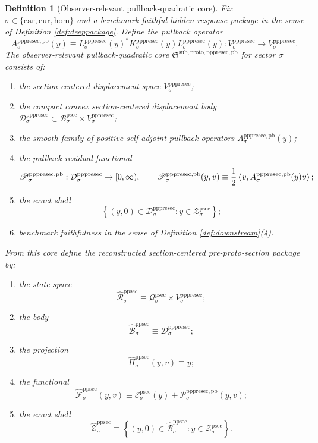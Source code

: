 \documentclass[11pt]{article}
\newcommand{\Car}{\mathrm{car}}
\newcommand{\Cur}{\mathrm{cur}}
\newcommand{\Hom}{\mathrm{hom}}
\newcommand{\ProtoSectionState}[1]{\mathcal Q_{#1}^{\mathrm{psec}}}
\newcommand{\ProtoSectionBody}[1]{\mathcal B_{#1}^{\mathrm{psec}}}
\newcommand{\ProtoSectionFunctional}[1]{\mathscr E_{#1}^{\mathrm{psec}}}
\newcommand{\ProtoSectionShell}[1]{\mathcal Z_{#1}^{\mathrm{psec}}}
\newcommand{\PrePreProtoSectionVertical}[1]{V_{#1}^{\mathrm{pppresec}}}
\newcommand{\PrePreProtoSectionResidualBody}[1]{\mathcal D_{#1}^{\mathrm{pppresec}}}
\newcommand{\PrePreProtoSectionResponseMap}[1]{L_{#1}^{\mathrm{pppresec}}}
\newcommand{\PrePreProtoSectionOperator}[1]{K_{#1}^{\mathrm{pppresec}}}
\newcommand{\PrePreProtoSectionPullbackCore}{\mathfrak S^{\mathrm{sub,proto,pppresec,pb}}}
\newcommand{\PrePreProtoSectionPullbackOperator}[1]{A_{#1}^{\mathrm{pppresec,pb}}}
\newcommand{\PrePreProtoSectionPullbackFunctional}[1]{\mathscr P_{#1}^{\mathrm{pppresec,pb}}}
\newcommand{\PullbackPreProtoSectionState}[1]{\widehat{\mathcal R}_{#1}^{\mathrm{ppsec}}}
\newcommand{\PullbackPreProtoSectionBody}[1]{\widehat{\mathcal B}_{#1}^{\mathrm{ppsec}}}
\newcommand{\PullbackPreProtoSectionProj}[1]{\widehat{\Pi}_{#1}^{\mathrm{ppsec}}}
\newcommand{\PullbackPreProtoSectionFunctional}[1]{\widehat{\mathscr F}_{#1}^{\mathrm{ppsec}}}
\newcommand{\PullbackPreProtoSectionShell}[1]{\widehat{\mathcal Z}_{#1}^{\mathrm{ppsec}}}
\newtheorem{definition}{Definition}
\begin{document}
\begin{definition}[Observer-relevant pullback-quadratic core]
\label{def:pullback}
Fix \(\sigma\in\{\Car,\Cur,\Hom\}\) and a benchmark-faithful hidden-response package in the sense of Definition \ref{def:deeppackage}. Define the pullback operator
\[
\PrePreProtoSectionPullbackOperator{\sigma}(y)
\equiv
\PrePreProtoSectionResponseMap{\sigma}(y)^{*}
\PrePreProtoSectionOperator{\sigma}(y)
\PrePreProtoSectionResponseMap{\sigma}(y)
:
\PrePreProtoSectionVertical{\sigma}\to\PrePreProtoSectionVertical{\sigma}.
\]
The \emph{observer-relevant pullback-quadratic core} \(\PrePreProtoSectionPullbackCore\) for sector \(\sigma\) consists of:
\begin{enumerate}
    \item the section-centered displacement space \(\PrePreProtoSectionVertical{\sigma}\);
    \item the compact convex section-centered displacement body \(\PrePreProtoSectionResidualBody{\sigma}\subset\ProtoSectionBody{\sigma}\times\PrePreProtoSectionVertical{\sigma}\);
    \item the smooth family of positive self-adjoint pullback operators \(\PrePreProtoSectionPullbackOperator{\sigma}(y)\);
    \item the pullback residual functional
    \[
    \PrePreProtoSectionPullbackFunctional{\sigma}:
    \PrePreProtoSectionResidualBody{\sigma}\to[0,\infty),
    \qquad
    \PrePreProtoSectionPullbackFunctional{\sigma}(y,v)
    \equiv
    \frac{1}{2}
    \ev{v,\PrePreProtoSectionPullbackOperator{\sigma}(y)v};
    \]
    \item the exact shell
    \[
    \left\{
    (y,0)\in\PrePreProtoSectionResidualBody{\sigma}:y\in\ProtoSectionShell{\sigma}
    \right\};
    \]
    \item benchmark faithfulness in the sense of Definition \ref{def:downstream}(4).
\end{enumerate}
From this core define the reconstructed section-centered pre-proto-section package by:
\begin{enumerate}
    \item the state space
    \[
    \PullbackPreProtoSectionState{\sigma}
    \equiv
    \ProtoSectionState{\sigma}\times\PrePreProtoSectionVertical{\sigma};
    \]
    \item the body
    \[
    \PullbackPreProtoSectionBody{\sigma}
    \equiv
    \PrePreProtoSectionResidualBody{\sigma};
    \]
    \item the projection
    \[
    \PullbackPreProtoSectionProj{\sigma}(y,v)\equiv y;
    \]
    \item the functional
    \[
    \PullbackPreProtoSectionFunctional{\sigma}(y,v)
    \equiv
    \ProtoSectionFunctional{\sigma}(y)
    +
    \PrePreProtoSectionPullbackFunctional{\sigma}(y,v);
    \]
    \item the exact shell
    \[
    \PullbackPreProtoSectionShell{\sigma}
    \equiv
    \left\{
    (y,0)\in\PullbackPreProtoSectionBody{\sigma}:y\in\ProtoSectionShell{\sigma}
    \right\}.
    \]
\end{enumerate}
\end{definition}
\end{document}
